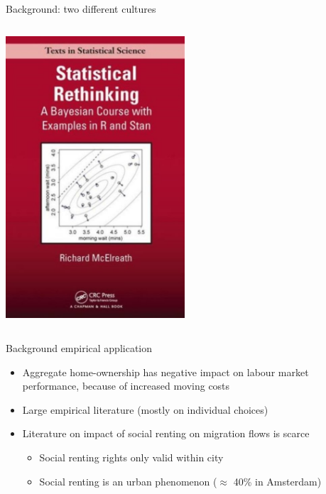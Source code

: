 \documentclass{beamer}
\begin{document}
\begin{frame}{Background: two different cultures \citep{breiman2001statistical}}
\begin{columns}
\begin{column}{0.5\textwidth}
\begin{center}
				\includegraphics[width=0.5\textwidth]{../fig/rethinking}      
			\end{center}
		\end{column}
	\end{columns}
\end{frame}

  \begin{frame}{Background empirical application}
    	\begin{itemize}
		\item Aggregate home-ownership has negative impact on labour market performance, because of increased \alert{moving costs} \citep{oswald1996conjecture,oswald1999housing}
		\newline
		\item Large empirical literature (mostly on individual choices)
		\newline
		\item Literature on impact of social renting on migration flows is scarce \citep{de2009homeownership}
		\begin{itemize}
			\item Social renting rights only valid \alert{within} city \citep[but][]{boyle1998migration}
			\item Social renting is an \alert{urban} phenomenon ($\approx$ 40\% in Amsterdam)
		\end{itemize}
    	\end{itemize}
  \end{frame}
\end{document}

